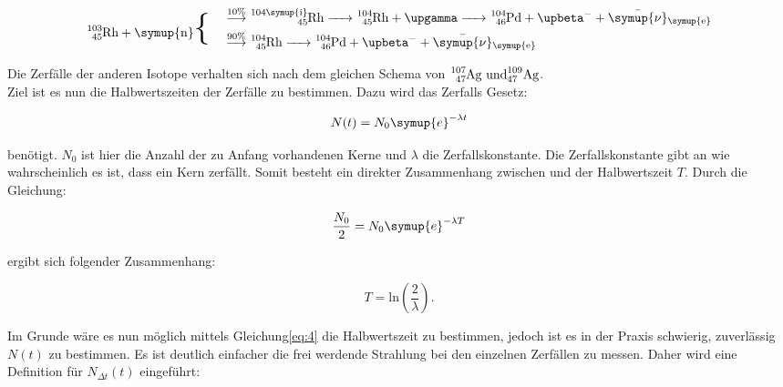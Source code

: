 \begin{equation}
   \begin{split}
      \ce{^{103}_{45}\text{Rh} + \symup{n}} \mathbin{\scalebox{2.5} \textbraceleft } \quad
   \end{split}
   \begin{split}
      &\overset{10\%}{\longrightarrow} \ce{^{104\symup{i}}_{45}\text{Rh} -> ^{104}_{45}\text{Rh} + $\upgamma$ -> ^{104}_{46}\text{Pd} + $\upbeta$^- + \bar{\symup{\nu}}_{\symup{e}} } \\
      &\overset{90\%}{\longrightarrow} \ce{^{104}_{45}\text{Rh} -> ^{104}_{46}\text{Pd} + $\upbeta$^- +\bar{\symup{\nu}}_{\symup{e}} } \\
   \end{split}
   \label{eq:Rh103}
\end{equation}

Die Zerfälle der anderen Isotope verhalten sich nach dem gleichen Schema von $\ce{^{107}_{47}\text{Ag und}^{109}_{47}\text{Ag}}$.\\
Ziel ist es nun die Halbwertszeiten der Zerfälle zu bestimmen. Dazu wird das Zerfalls Gesetz:

\begin{equation}
   N(t) = N_0 \symup{e}^{- \lambda t} 
   \label{eq:4}
\end{equation}

\noindent benötigt. $N_0$ ist hier die Anzahl der zu Anfang vorhandenen Kerne und $\lambda$ die Zerfallskonstante. Die Zerfallskonstante gibt an 
wie wahrscheinlich es ist, dass ein Kern zerfällt. Somit besteht ein direkter Zusammenhang zwischen \lambda und der Halbwertszeit $T$.
Durch die Gleichung:

\begin{equation*}
   \frac{N_0}{2} = N_0 \symup{e}^{- \lambda T} 
\end{equation*}

\noindent ergibt sich folgender Zusammenhang:

\begin{equation*}
   T = \text{ln}\left(\frac{2}{\lambda}\right) . \nonumber
\end{equation*}

\noindent Im Grunde wäre es nun möglich mittels Gleichung\ref{eq:4} die Halbwertszeit zu bestimmen, jedoch ist es in der Praxis schwierig, 
zuverlässig $N(t)$ zu bestimmen. Es ist deutlich einfacher die frei werdende Strahlung bei den einzelnen Zerfällen zu messen.
Daher wird eine Definition für $N_{\Delta t}(t)$ eingeführt:

